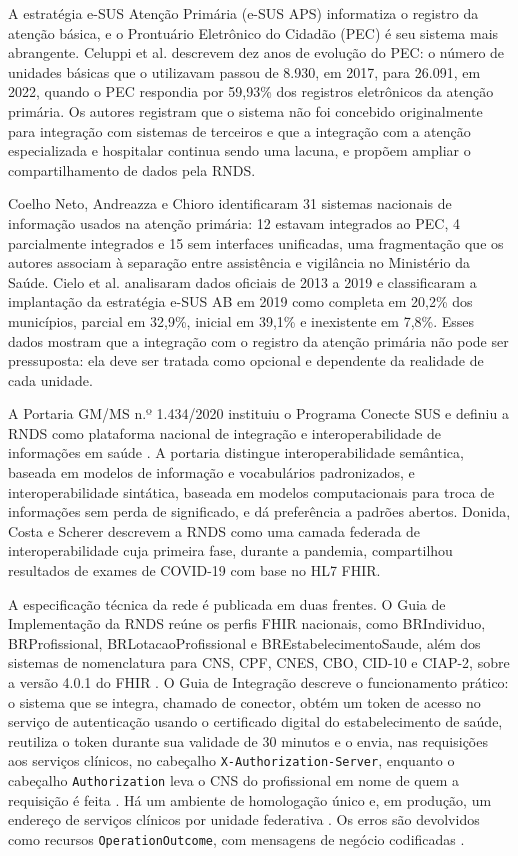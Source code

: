 A estratégia e-SUS Atenção Primária (e-SUS APS) informatiza o registro da atenção básica, e o Prontuário Eletrônico do Cidadão (PEC) é seu sistema mais abrangente. Celuppi et al. \cite{celuppi2024} descrevem dez anos de evolução do PEC: o número de unidades básicas que o utilizavam passou de 8.930, em 2017, para 26.091, em 2022, quando o PEC respondia por 59,93\% dos registros eletrônicos da atenção primária. Os autores registram que o sistema não foi concebido originalmente para integração com sistemas de terceiros e que a integração com a atenção especializada e hospitalar continua sendo uma lacuna, e propõem ampliar o compartilhamento de dados pela RNDS.

Coelho Neto, Andreazza e Chioro \cite{neto2021} identificaram 31 sistemas nacionais de informação usados na atenção primária: 12 estavam integrados ao PEC, 4 parcialmente integrados e 15 sem interfaces unificadas, uma fragmentação que os autores associam à separação entre assistência e vigilância no Ministério da Saúde. Cielo et al. \cite{cielo2022} analisaram dados oficiais de 2013 a 2019 e classificaram a implantação da estratégia e-SUS AB em 2019 como completa em 20,2\% dos municípios, parcial em 32,9\%, inicial em 39,1\% e inexistente em 7,8\%. Esses dados mostram que a integração com o registro da atenção primária não pode ser pressuposta: ela deve ser tratada como opcional e dependente da realidade de cada unidade.


A Portaria GM/MS n.º 1.434/2020 instituiu o Programa Conecte SUS e definiu a RNDS como plataforma nacional de integração e interoperabilidade de informações em saúde \cite{portaria1434}. A portaria distingue interoperabilidade semântica, baseada em modelos de informação e vocabulários padronizados, e interoperabilidade sintática, baseada em modelos computacionais para troca de informações sem perda de significado, e dá preferência a padrões abertos. Donida, Costa e Scherer \cite{donida2021} descrevem a RNDS como uma camada federada de interoperabilidade cuja primeira fase, durante a pandemia, compartilhou resultados de exames de COVID-19 com base no HL7 FHIR.

A especificação técnica da rede é publicada em duas frentes. O Guia de Implementação da RNDS reúne os perfis FHIR nacionais, como BRIndividuo, BRProfissional, BRLotacaoProfissional e BREstabelecimentoSaude, além dos sistemas de nomenclatura para CNS, CPF, CNES, CBO, CID-10 e CIAP-2, sobre a versão 4.0.1 do FHIR \cite{rndsig}. O Guia de Integração descreve o funcionamento prático: o sistema que se integra, chamado de conector, obtém um token de acesso no serviço de autenticação usando o certificado digital do estabelecimento de saúde, reutiliza o token durante sua validade de 30 minutos e o envia, nas requisições aos serviços clínicos, no cabeçalho \texttt{X-Authorization-Server}, enquanto o cabeçalho \texttt{Authorization} leva o CNS do profissional em nome de quem a requisição é feita \cite{rndsconector, rndserros}. Há um ambiente de homologação único e, em produção, um endereço de serviços clínicos por unidade federativa \cite{rndsambientes}. Os erros são devolvidos como recursos \texttt{OperationOutcome}, com mensagens de negócio codificadas \cite{rndserros}.

